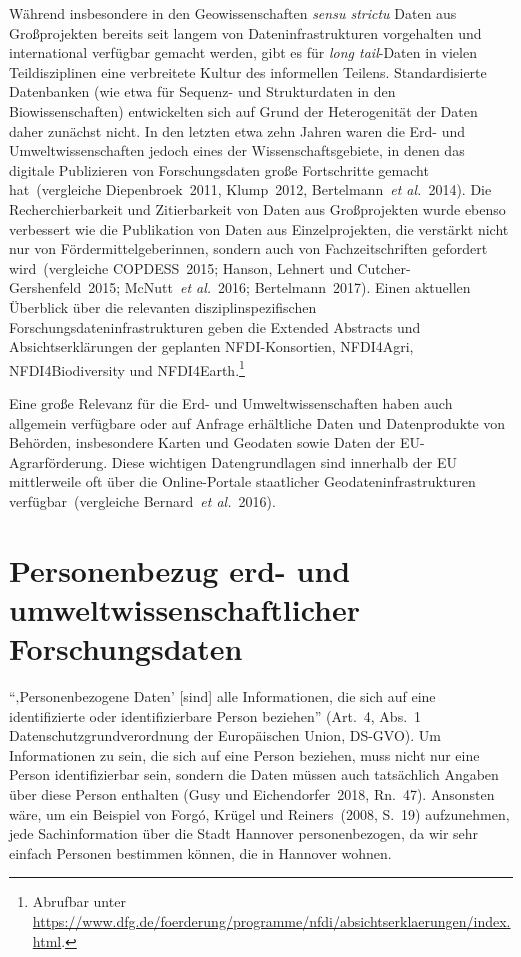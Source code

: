 \documentclass[a4paper,
fontsize=11pt,
oneside,
numbers=noperiodatend,
parskip=half-,
bibliography=totoc,
final
]{scrartcl}
\begin{document}
Während insbesondere in den Geowissenschaften \emph{sensu strictu} Daten
aus Großprojekten bereits seit langem von Dateninfrastrukturen
vorgehalten und international verfügbar gemacht werden, gibt es für
\emph{long tail}-Daten in vielen Teildisziplinen eine verbreitete Kultur
des informellen Teilens. Standardisierte Datenbanken (wie etwa für
Sequenz- und Strukturdaten in den Biowissenschaften) entwickelten sich
auf Grund der Heterogenität der Daten daher zunächst nicht. In den
letzten etwa zehn Jahren waren die Erd- und Umweltwissenschaften jedoch
eines der Wissenschaftsgebiete, in denen das digitale Publizieren von
Forschungsdaten große Fortschritte gemacht hat~(vergleiche
Diepenbroek~2011, Klump~2012, Bertelmann~\emph{et al.}~2014). Die
Recherchierbarkeit und Zitierbarkeit von Daten aus Großprojekten wurde
ebenso verbessert wie die Publikation von Daten aus Einzelprojekten, die
verstärkt nicht nur von Fördermittelgeberinnen, sondern auch von
Fachzeitschriften gefordert wird~(vergleiche COPDESS~2015; Hanson,
Lehnert und Cutcher-Gershenfeld~2015; McNutt~\emph{et al.}~2016;
Bertelmann~2017). Einen aktuellen Überblick über die relevanten
disziplinspezifischen Forschungsdateninfrastrukturen geben die Extended
Abstracts und Absichtserklärungen der geplanten NFDI-Konsortien,
NFDI4Agri, NFDI4Biodiversity und NFDI4Earth.\footnote{Abrufbar unter
  \url{https://www.dfg.de/foerderung/programme/nfdi/absichtserklaerungen/index.html}.}

Eine große Relevanz für die Erd- und Umweltwissenschaften haben auch
allgemein verfügbare oder auf Anfrage erhältliche Daten und
Datenprodukte von Behörden, insbesondere Karten und Geodaten sowie Daten
der EU-Agrarförderung. Diese wichtigen Datengrundlagen sind innerhalb
der EU mittlerweile oft über die Online-Portale staatlicher
Geodateninfrastrukturen verfügbar~(vergleiche Bernard~\emph{et
al.}~2016).

\hypertarget{personenbezug-erd--und-umweltwissenschaftlicher-forschungsdaten}{%
\section{Personenbezug erd- und umweltwissenschaftlicher
Forschungsdaten}\label{personenbezug-erd--und-umweltwissenschaftlicher-forschungsdaten}}

\enquote{‚Personenbezogene Daten' {[}sind{]} alle Informationen, die
sich auf eine identifizierte oder identifizierbare Person beziehen}
(Art.~4, Abs.~1 Datenschutzgrundverordnung der Europäischen Union,
DS-GVO). Um Informationen zu sein, die sich auf eine Person beziehen,
muss nicht nur eine Person identifizierbar sein, sondern die Daten
müssen auch tatsächlich Angaben über diese Person enthalten (Gusy und
Eichendorfer~2018, Rn.~47). Ansonsten wäre, um ein Beispiel von Forgó,
Krügel und Reiners~(2008, S.~19) aufzunehmen, jede Sachinformation über
die Stadt Hannover personenbezogen, da wir sehr einfach Personen
bestimmen können, die in Hannover wohnen.
\end{document}

